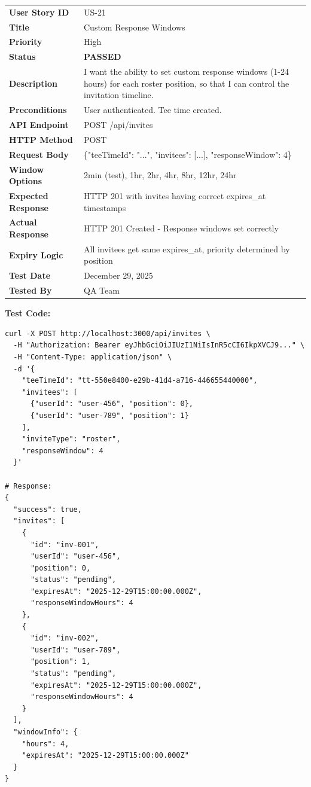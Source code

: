 \documentclass[11pt,a4paper]{article}
\newcommand{\passed}{\textcolor{pass}{\textbf{PASSED}}}
\begin{document}
\begin{tabularx}{\textwidth}{|p{3.2cm}|Y|}
\hline
{}
 \\
\hline
\textbf{User Story ID} & US-21 \\
\hline
\textbf{Title} & Custom Response Windows \\
\hline
\textbf{Priority} & High \\
\hline
\textbf{Status} & \passed \\
\hline
\textbf{Description} & I want the ability to set custom response windows (1-24 hours) for each roster position, so that I can control the invitation timeline. \\
\hline
\textbf{Preconditions} & User authenticated. Tee time created. \\
\hline
\textbf{API Endpoint} & POST /api/invites \\
\hline
\textbf{HTTP Method} & POST \\
\hline
\textbf{Request Body} & \{"teeTimeId": "...", "invitees": [...], "responseWindow": 4\} \\
\hline
\textbf{Window Options} & 2min (test), 1hr, 2hr, 4hr, 8hr, 12hr, 24hr \\
\hline
\textbf{Expected Response} & HTTP 201 with invites having correct expires\_at timestamps \\
\hline
\textbf{Actual Response} & HTTP 201 Created - Response windows set correctly \\
\hline
\textbf{Expiry Logic} & All invitees get same expires\_at, priority determined by position \\
\hline
\textbf{Test Date} & December 29, 2025 \\
\hline
\textbf{Tested By} & QA Team \\
\hline
\end{tabularx}

\vspace{0.3cm}
\textbf{Test Code:}
\begin{lstlisting}
curl -X POST http://localhost:3000/api/invites \
  -H "Authorization: Bearer eyJhbGciOiJIUzI1NiIsInR5cCI6IkpXVCJ9..." \
  -H "Content-Type: application/json" \
  -d '{
    "teeTimeId": "tt-550e8400-e29b-41d4-a716-446655440000",
    "invitees": [
      {"userId": "user-456", "position": 0},
      {"userId": "user-789", "position": 1}
    ],
    "inviteType": "roster",
    "responseWindow": 4
  }'

# Response:
{
  "success": true,
  "invites": [
    {
      "id": "inv-001",
      "userId": "user-456",
      "position": 0,
      "status": "pending",
      "expiresAt": "2025-12-29T15:00:00.000Z",
      "responseWindowHours": 4
    },
    {
      "id": "inv-002",
      "userId": "user-789",
      "position": 1,
      "status": "pending",
      "expiresAt": "2025-12-29T15:00:00.000Z",
      "responseWindowHours": 4
    }
  ],
  "windowInfo": {
    "hours": 4,
    "expiresAt": "2025-12-29T15:00:00.000Z"
  }
}
\end{lstlisting}
\end{document}
